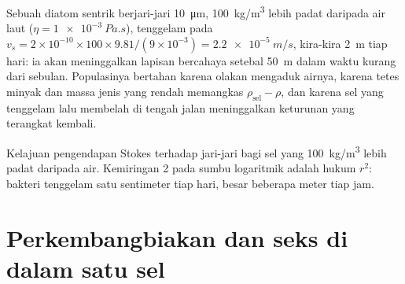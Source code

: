 \begin{example}\label{ex:b2:unicellular-diversity:fall}
Sebuah diatom sentrik berjari-jari \qty{10}{\micro m}, \qty{100}{kg/m^3}
lebih padat daripada air laut ($\eta = \qty{1e-3}{Pa.s}$), tenggelam pada
$v_s = 2\times 10^{-10}\times 100\times 9.81/(9\times 10^{-3}) =
\qty{2.2e-5}{m/s}$, kira-kira \qty{2}{m} tiap hari: ia akan meninggalkan
lapisan bercahaya setebal \qty{50}{m} dalam waktu kurang dari sebulan.
Populasinya bertahan karena olakan mengaduk airnya, karena tetes minyak
dan massa jenis yang rendah memangkas $\rho_{\text{sel}} - \rho$, dan
karena sel yang tenggelam lalu membelah di tengah jalan meninggalkan
keturunan yang terangkat kembali.
\end{example}

\begin{omfigure}

{\small Kelajuan pengendapan Stokes terhadap jari-jari bagi sel yang
\qty{100}{kg/m^3} lebih padat daripada air. Kemiringan 2 pada sumbu
logaritmik adalah hukum $r^2$: bakteri tenggelam satu sentimeter tiap
hari,  besar beberapa meter tiap jam.}
\end{omfigure}

\section{Perkembangbiakan dan seks di dalam satu sel}

